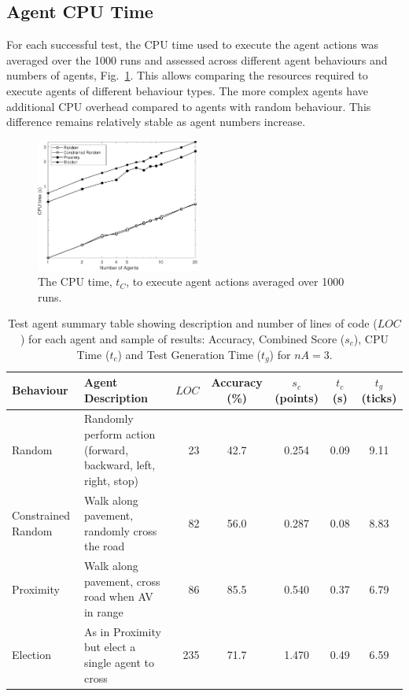 \documentclass[letterpaper, 10 pt, journal, twoside]{IEEEtran}
\begin{document}


\subsection{Agent CPU Time}
For each successful test, the CPU time used to execute the agent actions was averaged over the 1000 runs and assessed across different agent behaviours and numbers of agents, Fig.~\ref{f:cputime}. This allows comparing the resources required to execute agents of different behaviour types. The more complex agents have additional CPU overhead compared to agents with random behaviour. This difference remains relatively stable as agent numbers increase.

\begin{figure}[!t]
	\centering
\includegraphics[width=0.48\textwidth]{TimeCPU.pdf}
	\caption{The CPU time, $t_{C}$, to execute agent actions averaged over 1000 runs.}
	\label{f:cputime}
\end{figure}



\begin{table}
\centering
\caption{Test agent summary table showing description and number of lines of code ($LOC$) for each agent and sample of results: Accuracy, Combined Score ($s_c$), CPU Time ($t_{c}$) and Test Generation Time ($t_{g}$) for $nA=3$.}
\label{t:ResultsTable}
\begin{tabular}{|l|p{7.1cm}|r||c|c|c|c|}
\hline
\textbf{Behaviour} & \textbf{Agent Description} & $LOC$ & Accuracy (\%) & $s_c$ (points)&  $t_{c}$ (s) & $t_{g}$ (ticks) \\
\hline
Random & Randomly perform action (forward, backward, left, right, stop) &  23& 42.7 & 0.254 & 0.09 & 9.11 \\
Constrained Random & Walk along pavement, randomly cross the road 		&  82& 56.0 & 0.287 & 0.08 & 8.83 \\
Proximity & Walk along pavement, cross road when AV in range 			&  86& 85.5 & 0.540 & 0.37 & 6.79 \\
Election & As in Proximity but elect a single agent to cross 			& 235& 71.7 & 1.470 & 0.49 & 6.59 \\
\hline 
\end{tabular}
\end{table}
\end{document}
